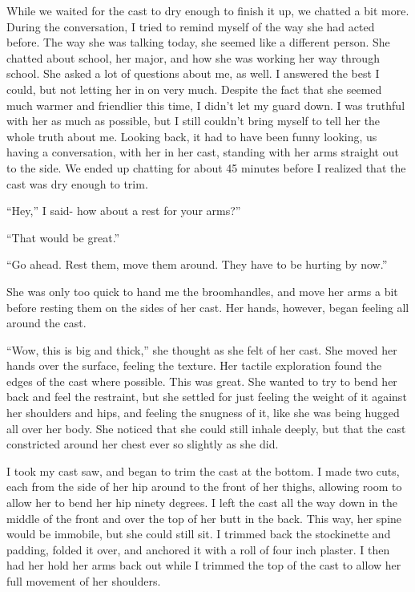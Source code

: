 While we waited for the cast to dry enough to finish it up, we chatted a bit more. During
the conversation, I tried to remind myself of the way she had acted before. The way she was
talking today, she seemed like a different person. She chatted about school, her major, and how
she was working her way through school. She asked a lot of questions about me, as well. I
answered the best I could, but not letting her in on very much. Despite the fact that she seemed
much warmer and friendlier this time, I didn't let my guard down. I was truthful with her as
much as possible, but I still couldn't bring myself to tell her the whole truth about me.
Looking back, it had to have been funny looking, us having a conversation, with her in her cast,
standing with her arms straight out to the side. We ended up chatting for about 45 minutes
before I realized that the cast was dry enough to trim.

``Hey,'' I said- how about a rest for your arms?''

``That would be great.''

``Go ahead. Rest them, move them around. They have to be hurting by now.''

She was only too quick to hand me the broomhandles, and move her arms a bit before resting
them on the sides of her cast. Her hands, however, began feeling all around the cast.

\begin{thought}
``Wow, this is big and thick,'' she thought as she felt of her cast. She moved her hands over
the surface, feeling the texture. Her tactile exploration found the edges of the cast where
possible. This was great. She wanted to try to bend her back and feel the restraint, but she
settled for just feeling the weight of it against her shoulders and hips, and feeling the
snugness of it, like she was being hugged all over her body. She noticed that she could still
inhale deeply, but that the cast constricted around her chest ever so slightly as she did.
\end{thought}

I took my cast saw, and began to trim the cast at the bottom. I made two cuts, each from the
side of her hip around to the front of her thighs, allowing room to allow her to bend her hip
ninety degrees. I left the cast all the way down in the middle of the front and over the top of
her butt in the back. This way, her spine would be immobile, but she could still sit. I trimmed
back the stockinette and padding, folded it over, and anchored it with a roll of four inch
plaster. I then had her hold her arms back out while I trimmed the top of the cast to allow her
full movement of her shoulders.

